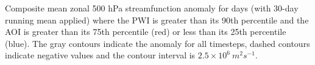 \label{fig:sam_composite}
Composite mean zonal 500 hPa streamfunction anomaly for days (with 30-day running mean applied) where the PWI is greater than its 90th percentile and the AOI is greater than its 75th percentile (red) or less than its 25th percentile (blue). The gray contours indicate the anomaly for all timesteps, dashed contours indicate negative values and the contour interval is $2.5 \times 10^6 \: m^2 s^{-1}$. 